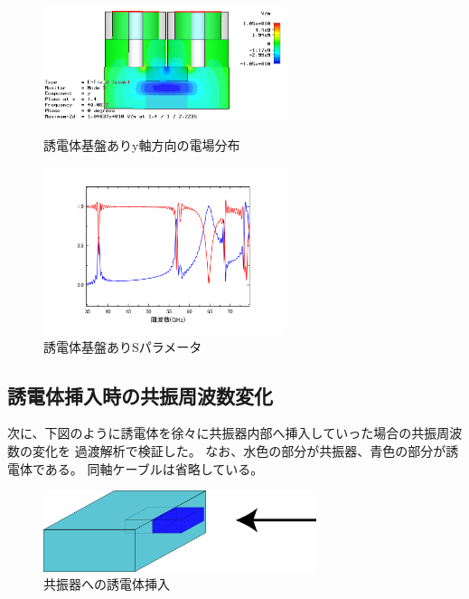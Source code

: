 \begin{figure}[h]
 \begin{minipage}{0.5\hsize}
  \begin{center}
   \includegraphics[width=70mm]{./image/model73_y_x.png}
  \end{center}
  \caption{誘電体基盤ありy軸方向の電場分布}
  \label{fig:one}
 \end{minipage}
 \begin{minipage}{0.5\hsize}
  \begin{center}
   \includegraphics[width=70mm]{./image/Graph4.jpg}
  \end{center}
  \caption{誘電体基盤ありSパラメータ}
  \label{fig:two}
 \end{minipage}
\end{figure}

\subsection{誘電体挿入時の共振周波数変化}
次に、下図のように誘電体を徐々に共振器内部へ挿入していった場合の共振周波数の変化を
過渡解析で検証した。
なお、水色の部分が共振器、青色の部分が誘電体である。
同軸ケーブルは省略している。
\vspace{10 mm}

\begin{figure}[h]
  \begin{center}
    \includegraphics[width=8cm]{./image/insert.png}
    \caption{共振器への誘電体挿入}
    \label{fig:insert}
  \end{center}
\end{figure}

